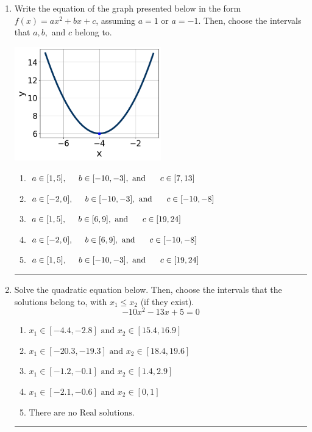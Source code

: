 \documentclass[14pt]{extbook}
\newcommand{\litem}[1]{\item#1\hspace*{-1cm}\rule{\textwidth}{0.4pt}}
\begin{document}
\begin{enumerate}
{\begin{enumerate}[label=\Alph*.]
\end{enumerate} }
\litem{
Write the equation of the graph presented below in the form $f(x)=ax^2+bx+c$, assuming  $a=1$ or $a=-1$. Then, choose the intervals that $a, b,$ and $c$ belong to.
\begin{center}
    \includegraphics[width=0.5\textwidth]{../Figures/quadraticGraphToEquationA.png}
\end{center}
\begin{enumerate}[label=\Alph*.]
\item \( a \in [1, 5], \hspace*{5mm} b \in [-10, -3], \text{ and } \hspace*{5mm} c \in [7, 13] \)
\item \( a \in [-2, 0], \hspace*{5mm} b \in [-10, -3], \text{ and } \hspace*{5mm} c \in [-10, -8] \)
\item \( a \in [1, 5], \hspace*{5mm} b \in [6, 9], \text{ and } \hspace*{5mm} c \in [19, 24] \)
\item \( a \in [-2, 0], \hspace*{5mm} b \in [6, 9], \text{ and } \hspace*{5mm} c \in [-10, -8] \)
\item \( a \in [1, 5], \hspace*{5mm} b \in [-10, -3], \text{ and } \hspace*{5mm} c \in [19, 24] \)

\end{enumerate} }
\litem{
Solve the quadratic equation below. Then, choose the intervals that the solutions belong to, with $x_1 \leq x_2$ (if they exist).\[ -10x^{2} -13 x + 5 = 0 \]\begin{enumerate}[label=\Alph*.]
\item \( x_1 \in [-4.4, -2.8] \text{ and } x_2 \in [15.4, 16.9] \)
\item \( x_1 \in [-20.3, -19.3] \text{ and } x_2 \in [18.4, 19.6] \)
\item \( x_1 \in [-1.2, -0.1] \text{ and } x_2 \in [1.4, 2.9] \)
\item \( x_1 \in [-2.1, -0.6] \text{ and } x_2 \in [0, 1] \)
\item \( \text{There are no Real solutions.} \)


\end{enumerate}}
\end{enumerate}
\end{document}
